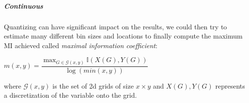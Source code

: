 \subparagraph{Continuous}
Quantizing can have significant impact on the results, we could then try to estimate
many different bin sizes and locations to finally compute the maximum MI achieved 
called \emph{maximal information coefficient}:
\begin{center}
    $m(x,y) = \dfrac{\max_{G\in\mathcal{G}(x,y)}\mathbb{I}\left(X(G),Y(G)\right)}{
    \log\left(min(x,y)\right)}$
\end{center}
where $\mathcal{G}(x,y)$ is the set of 2d grids of size $x\times y$ and $X(G), Y(G)$
represents a discretization of the variable onto the grid.


